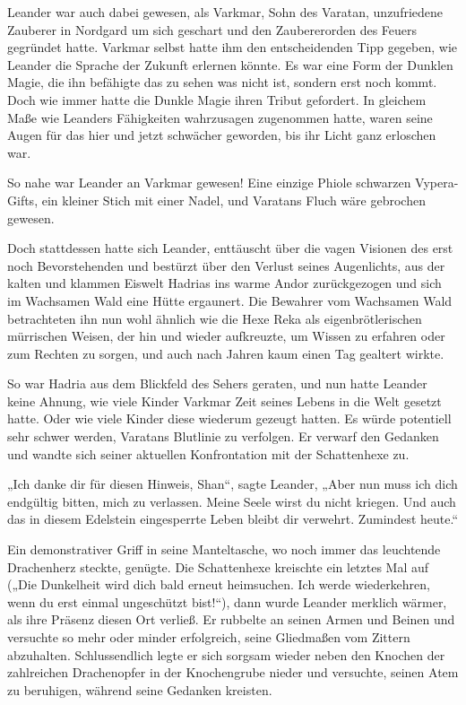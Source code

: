 \documentclass[10pt, a4paper, oneside]{book}
\begin{document}
Leander war auch dabei gewesen, als Varkmar, Sohn des Varatan, unzufriedene Zauberer in Nordgard um sich geschart und den Zaubererorden des Feuers gegründet hatte. Varkmar selbst hatte ihm den entscheidenden Tipp gegeben, wie Leander die Sprache der Zukunft erlernen könnte. Es war eine Form der Dunklen Magie, die ihn befähigte das zu sehen was nicht ist, sondern erst noch kommt. Doch wie immer hatte die Dunkle Magie ihren Tribut gefordert. In gleichem Maße wie Leanders Fähigkeiten wahrzusagen zugenommen hatte, waren seine Augen für das hier und jetzt schwächer geworden, bis ihr Licht ganz erloschen war.

So nahe war Leander an Varkmar gewesen! Eine einzige Phiole schwarzen Vypera-Gifts, ein kleiner Stich mit einer Nadel, und Varatans Fluch wäre gebrochen gewesen.

Doch stattdessen hatte sich Leander, enttäuscht über die vagen Visionen des erst noch Bevorstehenden und bestürzt über den Verlust seines Augenlichts, aus der kalten und klammen Eiswelt Hadrias ins warme Andor zurückgezogen und sich im Wachsamen Wald eine Hütte ergaunert. Die Bewahrer vom Wachsamen Wald betrachteten ihn nun wohl ähnlich wie die Hexe Reka als eigenbrötlerischen mürrischen Weisen, der hin und wieder aufkreuzte, um Wissen zu erfahren oder zum Rechten zu sorgen, und auch nach Jahren kaum einen Tag gealtert wirkte.

So war Hadria aus dem Blickfeld des Sehers geraten, und nun hatte Leander keine Ahnung, wie viele Kinder Varkmar Zeit seines Lebens in die Welt gesetzt hatte. Oder wie viele Kinder diese wiederum gezeugt hatten. Es würde potentiell sehr schwer werden, Varatans Blutlinie zu verfolgen. Er verwarf den Gedanken und wandte sich seiner aktuellen Konfrontation mit der Schattenhexe zu.

„Ich danke dir für diesen Hinweis, Shan“, sagte Leander, „Aber nun muss ich dich endgültig bitten, mich zu verlassen. Meine Seele wirst du nicht kriegen. Und auch das in diesem Edelstein eingesperrte Leben bleibt dir verwehrt. Zumindest heute.“

Ein demonstrativer Griff in seine Manteltasche, wo noch immer das leuchtende Drachenherz steckte, genügte. Die Schattenhexe kreischte ein letztes Mal auf („Die Dunkelheit wird dich bald erneut heimsuchen. Ich werde wiederkehren, wenn du erst einmal ungeschützt bist!“), dann wurde Leander merklich wärmer, als ihre Präsenz diesen Ort verließ. Er rubbelte an seinen Armen und Beinen und versuchte so mehr oder minder erfolgreich, seine Gliedmaßen vom Zittern abzuhalten. Schlussendlich legte er sich sorgsam wieder neben den Knochen der zahlreichen Drachenopfer in der Knochengrube nieder und versuchte, seinen Atem zu beruhigen, während seine Gedanken kreisten.\bigskip
\end{document}

